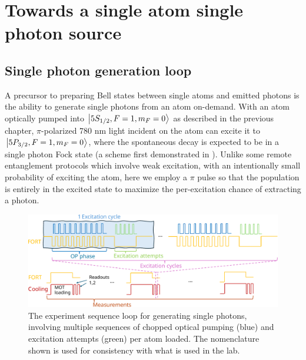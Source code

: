 \chapter{Towards a single atom single photon source}\label{ch:atomphoton}


\section{Single photon generation loop}
A precursor to preparing Bell states between single atoms and emitted photons is the ability to generate single photons from an atom on-demand\cite{Garcia2013, mucke2013generation, higginbottom2016pure}. With an atom optically pumped into $\ket{5S_{1/2},F=1,m_F=0}$ as described in the previous chapter, $\pi$-polarized 780 nm light incident on the atom can excite it to $\ket{5P_{3/2},F=1,m_F=0}$, where the spontaneous decay is expected to be in a single photon Fock state (a scheme first demonstrated in \cite{Volz2006}). Unlike some remote entanglement protocols which involve weak excitation\cite{cabrillo1999creation}, with an intentionally small probability of exciting the atom, here we employ a $\pi$ pulse so that the population is entirely in the excited state to maximize the per-excitation chance of extracting a photon. 

\begin{figure}[!h]
    \centering
    \includegraphics[width=\textwidth]{Images/single_photon_experiment_sequence.pdf}
    \caption{The experiment sequence loop for generating single photons, involving multiple sequences of chopped optical pumping (blue) and excitation attempts (green) per atom loaded. The nomenclature shown is used for consistency with what is used in the lab.}
    \label{fig:single_photon_sequence}
\end{figure}

